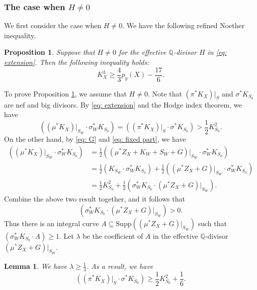 \documentclass[a4paper,11pt]{amsart}
\newcommand{\QQ}{\ensuremath{\mathbb{Q}}}
\newtheorem{lem}[thm]{Lemma}
\newtheorem{prop}[thm]{Proposition}
\theoremstyle{definition}
\theoremstyle{remark}
\numberwithin{equation}{section}
\begin{document}
\subsubsection{The case when $H \neq 0$} We first consider the case when $H \ne 0$. We have the following refined Noether inequality.
\begin{prop}\label{prop: Noether H>0}
	Suppose that $H \neq 0$ for the effective $\QQ$-divisor $H$ in \eqref{eq: extension}. Then the following inequality holds:
	$$
	K_X^3\ge \frac{4}{3}p_g(X)-\frac{17}{6}.
	$$
\end{prop}

To prove Proposition \ref{prop: Noether H>0}, we assume that $H \ne 0$. Note that $\left(\pi^*K_X\right)|_S$ and $\sigma^*K_{S_0}$ are nef and big divisors. By \eqref{eq: extension} and the Hodge index theorem, we have 
\begin{equation} \label{eq: KK1}
	\left((\mu^*K_X)|_{S_W} \cdot \sigma_W^*K_{S_0}\right) = \left((\pi^*K_X)|_S \cdot \sigma^*K_{S_0}\right) > \frac{1}{2} K_{S_0}^2.
\end{equation}
On the other hand, by \eqref{eq: G} and \eqref{eq: fixed part}, we have
\begin{align}
	\left((\mu^*K_X)|_{S_W} \cdot \sigma_W^*K_{S_0}\right) & = \frac{1}{2} \left((\mu^*Z_X + K_W + S_W + G)|_{S_W} \cdot \sigma_W^*K_{S_0}\right) \nonumber \\ & 
	= \frac{1}{2} \left(K_{S_W} \cdot \sigma_W^*K_{S_0}\right) + \frac{1}{2}\left((\mu^*Z_X + G)|_{S_W} \cdot \sigma_W^*K_{S_0}\right) \label{eq: KK2}\\
	& = \frac{1}{2}K_{S_0}^2 + \frac{1}{2} \left(\sigma_W^*K_{S_0} \cdot (\mu^*Z_X + G)|_{S_W}\right). \nonumber
\end{align}
Combine the above two result together, and it follows that 
$$
\left(\sigma_W^*K_{S_0} \cdot (\mu^*Z_X + G)|_{S_W}\right) > 0.
$$
Thus there is an integral curve $A\subseteq \mathrm{Supp} \left((\mu^*Z_X + G)|_{S_W}\right)$ such that $(\sigma_W^*K_{S_0} \cdot A) \ge 1$. Let $\lambda$ be the coefficient of $A$ in the effective $\QQ$-divisor $(\mu^*Z_X + G)|_{S_W}$.

\begin{lem} \label{lem: coeff of lamda}
	We have $\lambda \ge \frac{1}{3}$. As a result, we have
	$$
	\left((\pi^*K_X)|_S \cdot \sigma^*K_{S_0}\right) \ge \frac{1}{2} K_{S_0}^2 + \frac{1}{6}.
	$$
\end{lem}
\end{document}
